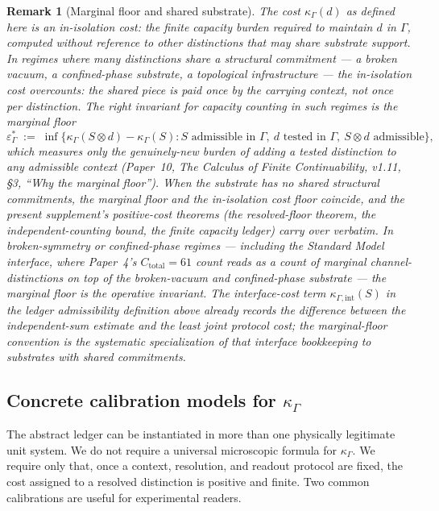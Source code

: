 \documentclass[11pt]{article}
\newtheorem{remark}[theorem]{Remark}
\begin{document}
\begin{remark}[Marginal floor and shared substrate]\label{rem:marginal-floor}
The cost $\kappa_\Gamma(d)$ as defined here is an in-isolation cost: the finite capacity burden required to maintain $d$ in $\Gamma$, computed without reference to other distinctions that may share substrate support.  In regimes where many distinctions share a structural commitment --- a broken vacuum, a confined-phase substrate, a topological infrastructure --- the in-isolation cost overcounts: the shared piece is paid once by the carrying context, not once per distinction.  The right invariant for capacity counting in such regimes is the \emph{marginal floor}
\[
        \varepsilon^*_\Gamma \;:=\; \inf\Big\{\kappa_\Gamma(S \otimes d) - \kappa_\Gamma(S) : S \text{ admissible in } \Gamma,\ d \text{ tested in } \Gamma,\ S \otimes d \text{ admissible}\Big\},
\]
which measures only the genuinely-new burden of adding a tested distinction to any admissible context (Paper~10, \emph{The Calculus of Finite Continuability}, v1.11, \S3, ``Why the marginal floor'').  When the substrate has no shared structural commitments, the marginal floor and the in-isolation cost floor coincide, and the present supplement's positive-cost theorems (the resolved-floor theorem, the independent-counting bound, the finite capacity ledger) carry over verbatim.  In broken-symmetry or confined-phase regimes --- including the Standard Model interface, where Paper~4's $C_{\mathrm{total}}=61$ count reads as a count of marginal channel-distinctions on top of the broken-vacuum and confined-phase substrate --- the marginal floor is the operative invariant.  The interface-cost term $\kappa_{\Gamma,\mathrm{int}}(S)$ in the ledger admissibility definition above already records the difference between the independent-sum estimate and the least joint protocol cost; the marginal-floor convention is the systematic specialization of that interface bookkeeping to substrates with shared commitments.
\end{remark}

\subsection*{Concrete calibration models for $\kappa_\Gamma$}\label{subsec:kappa-calibration}

The abstract ledger can be instantiated in more than one physically legitimate unit system.  We do not require a universal microscopic formula for $\kappa_\Gamma$. We require only that, once a context, resolution, and readout protocol are fixed, the cost assigned to a resolved distinction is positive and finite.  Two common calibrations are useful for experimental readers.
\end{document}
